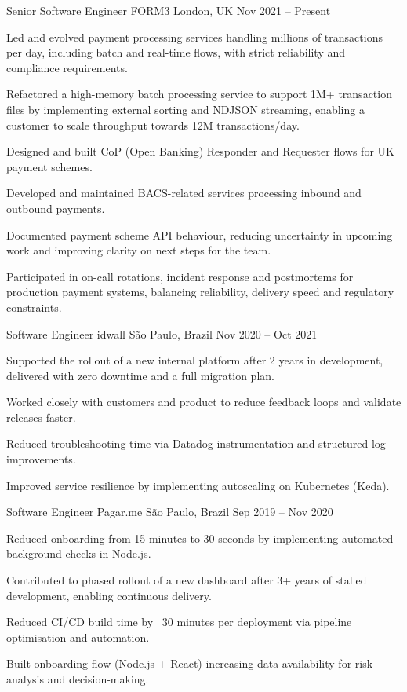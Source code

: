 
\cventry
  {Senior Software Engineer}
  {FORM3}
  {London, UK}
  {Nov 2021 -- Present}
  {
    \begin{cvitems}
      \item {Led and evolved payment processing services handling millions of transactions per day, including batch and real-time flows, with strict reliability and compliance requirements.}
      \item {Refactored a high-memory batch processing service to support 1M+ transaction files by implementing external sorting and NDJSON streaming, enabling a customer to scale throughput towards 12M transactions/day.}
      \item {Designed and built CoP (Open Banking) Responder and Requester flows for UK payment schemes.}
      \item {Developed and maintained BACS-related services processing inbound and outbound payments.}
      \item {Documented payment scheme API behaviour, reducing uncertainty in upcoming work and improving clarity on next steps for the team.}
      \item {Participated in on-call rotations, incident response and postmortems for production payment systems, balancing reliability, delivery speed and regulatory constraints.}
    \end{cvitems}
  }

\cventry
  {Software Engineer}
  {idwall}
  {São Paulo, Brazil}
  {Nov 2020 -- Oct 2021}
  {
    \begin{cvitems}
      \item {Supported the rollout of a new internal platform after 2 years in development, delivered with zero downtime and a full migration plan.}
      \item {Worked closely with customers and product to reduce feedback loops and validate releases faster.}
      \item {Reduced troubleshooting time via Datadog instrumentation and structured log improvements.}
      \item {Improved service resilience by implementing autoscaling on Kubernetes (Keda).}
    \end{cvitems}
  }

\cventry
  {Software Engineer}
  {Pagar.me}
  {São Paulo, Brazil}
  {Sep 2019 -- Nov 2020}
  {
    \begin{cvitems}
      \item {Reduced onboarding from 15 minutes to 30 seconds by implementing automated background checks in Node.js.}
      \item {Contributed to phased rollout of a new dashboard after 3+ years of stalled development, enabling continuous delivery.}
      \item {Reduced CI/CD build time by ~30 minutes per deployment via pipeline optimisation and automation.}
      \item {Built onboarding flow (Node.js + React) increasing data availability for risk analysis and decision-making.}
    \end{cvitems}
  }

